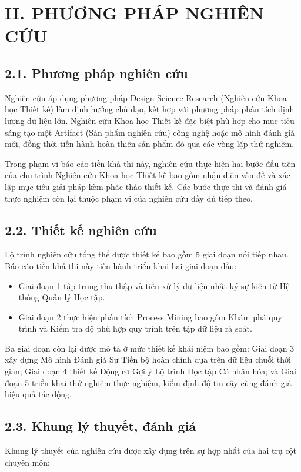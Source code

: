 \section{II. PHƯƠNG PHÁP NGHIÊN CỨU}

\subsection{2.1. Phương pháp nghiên cứu}
Nghiên cứu áp dụng phương pháp Design Science Research (Nghiên cứu Khoa học Thiết kế) làm định hướng chủ đạo, kết hợp với phương pháp phân tích định lượng dữ liệu lớn. Nghiên cứu Khoa học Thiết kế đặc biệt phù hợp cho mục tiêu sáng tạo một Artifact (Sản phẩm nghiên cứu) công nghệ hoặc mô hình đánh giá mới, đồng thời tiến hành hoàn thiện sản phẩm đó qua các vòng lặp thử nghiệm.

Trong phạm vi báo cáo tiền khả thi này, nghiên cứu thực hiện hai bước đầu tiên của chu trình Nghiên cứu Khoa học Thiết kế bao gồm nhận diện vấn đề và xác lập mục tiêu giải pháp kèm phác thảo thiết kế. Các bước thực thi và đánh giá thực nghiệm còn lại thuộc phạm vi của nghiên cứu đầy đủ tiếp theo.

\subsection{2.2. Thiết kế nghiên cứu}
Lộ trình nghiên cứu tổng thể được thiết kế bao gồm 5 giai đoạn nối tiếp nhau. Báo cáo tiền khả thi này tiến hành triển khai hai giai đoạn đầu:
\begin{itemize}
    \item Giai đoạn 1 tập trung thu thập và tiền xử lý dữ liệu nhật ký sự kiện từ Hệ thống Quản lý Học tập.
    \item Giai đoạn 2 thực hiện phân tích Process Mining bao gồm Khám phá quy trình và Kiểm tra độ phù hợp quy trình trên tập dữ liệu rà soát.
\end{itemize}

Ba giai đoạn còn lại được mô tả ở mức thiết kế khái niệm bao gồm: Giai đoạn 3 xây dựng Mô hình Đánh giá Sự Tiến bộ hoàn chỉnh dựa trên dữ liệu chuỗi thời gian; Giai đoạn 4 thiết kế Động cơ Gợi ý Lộ trình Học tập Cá nhân hóa; và Giai đoạn 5 triển khai thử nghiệm thực nghiệm, kiểm định độ tin cậy cùng đánh giá hiệu quả tác động.

\subsection{2.3. Khung lý thuyết, đánh giá}
Khung lý thuyết của nghiên cứu được xây dựng trên sự hợp nhất của hai trụ cột chuyên môn:

